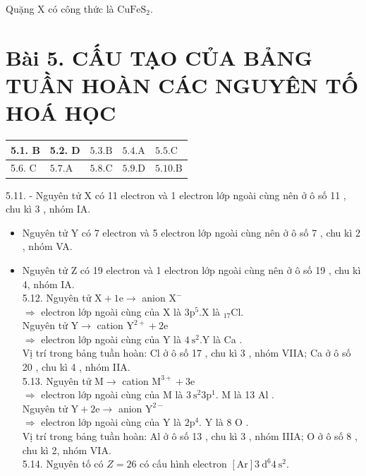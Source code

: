 \documentclass[10pt]{article}
\begin{document}
Quặng X có công thức là $\mathrm{CuFeS}_{2}$.

\section*{Bài 5. CẤU TẠO CỦA BẢNG TUẦN HOÀN CÁC NGUYÊN TỐ HOÁ HỌC}
\begin{center}
\begin{tabular}{|l|l|l|l|l|}
\hline
5.1. B & 5.2. D & $5.3 . \mathrm{B}$ & $5.4 . \mathrm{A}$ & $5.5 . \mathrm{C}$ \\
\hline
5.6. C & $5.7 . \mathrm{A}$ & $5.8 . \mathrm{C}$ & $5.9 . \mathrm{D}$ & $5.10 . \mathrm{B}$ \\
\hline
\end{tabular}
\end{center}

5.11. - Nguyên tử X có 11 electron và 1 electron lớp ngoài cùng nên ở ô số 11 , chu kì 3 , nhóm IA.

\begin{itemize}
  \item Nguyên tử Y có 7 electron và 5 electron lớp ngoài cùng nên ở ô số 7 , chu kì 2 , nhóm VA.
  \item Nguyên tử Z có 19 electron và 1 electron lớp ngoài cùng nên ở ô số 19 , chu kì 4, nhóm IA.\\
5.12. Nguyên tử $\mathrm{X}+1 \mathrm{e} \rightarrow$ anion $\mathrm{X}^{-}$\\
$\Rightarrow$ electron lớp ngoài cùng của X là $3 \mathrm{p}^{5} . \mathrm{X}$ là ${ }_{17} \mathrm{Cl}$.\\
Nguyên tử $\mathrm{Y} \rightarrow$ cation $\mathrm{Y}^{2+}+2 \mathrm{e}$\\
$\Rightarrow$ electron lớp ngoài cùng của Y là $4 \mathrm{~s}^{2} . \mathrm{Y}$ là Ca .\\
Vị trí trong bảng tuần hoàn: Cl ở ô số 17 , chu kì 3 , nhóm VIIA; Ca ở ô số 20 , chu kì 4 , nhóm IIA.\\
5.13. Nguyên tử $\mathrm{M} \rightarrow$ cation $\mathrm{M}^{3+}+3 \mathrm{e}$\\
$\Rightarrow$ electron lớp ngoài cùng của M là $3 \mathrm{~s}^{2} 3 \mathrm{p}^{1}$. M là 13 Al .\\
Nguyên tử $\mathrm{Y}+2 \mathrm{e} \rightarrow$ anion $\mathrm{Y}^{2-}$\\
$\Rightarrow$ electron lớp ngoài cùng của Y là $2 \mathrm{p}^{4}$. Y là 8 O .\\
Vị trí trong bảng tuần hoàn: Al ở ô số 13 , chu kì 3 , nhóm IIIA; O ở ô số 8 , chu kì 2, nhóm VIA.\\
5.14. Nguyên tố có $Z=26$ có cấu hình electron $[\mathrm{Ar}] 3 \mathrm{~d}^{6} 4 \mathrm{~s}^{2}$.
\end{itemize}
\end{document}
